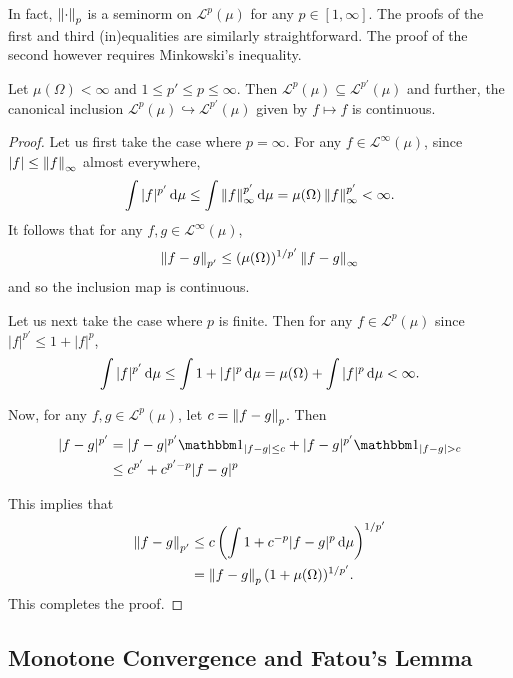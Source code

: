 In fact, $\left\lVert\cdot\right\rVert_p$ is a seminorm on $\mathcal{L}^p(\mu)$ for any $p\in[1,\infty]$. The proofs of the first and third (in)equalities are similarly straightforward. The proof of the second however requires Minkowski's inequality. %

\begin{theorem}
    Let $\mu(\Omega)<\infty$ and $1\leq p'\leq p\leq \infty$. Then $\mathcal{L}^{p}(\mu)\subseteq\mathcal{L}^{p'}(\mu)$ and further, the canonical inclusion $\mathcal{L}^{p}(\mu)\hookrightarrow\mathcal{L}^{p'}(\mu)$ given by $f\mapsto f$ is continuous.
\end{theorem}
\begin{proof}
    Let us first take the case where $p=\infty$. For any $f\in\mathcal{L}^\infty(\mu)$, since $|f|\leq \left\lVert f\right\rVert_\infty$ almost everywhere,
    $$\int |f|^{p'}\operatorname{d}\!{\mu} \leq \int \left\lVert f\right\rVert_\infty^{p'} \operatorname{d}\!{\mu} = \mu(\Omega)\left\lVert f\right\rVert_\infty^{p'} < \infty.$$
    It follows that for any $f,g\in\mathcal{L}^\infty(\mu)$,
    $$\left\lVert f-g\right\rVert_{p'} \leq (\mu(\Omega))^{1/p'}\left\lVert f-g\right\rVert_\infty$$
    and so the inclusion map is continuous.
    
    Let us next take the case where $p$ is finite. Then for any $f\in\mathcal{L}^{p}(\mu)$ since $|f|^{p'}\leq 1+|f|^p$,
    $$\int |f|^{p'}\operatorname{d}\!{\mu} \leq \int 1+|f|^p \operatorname{d}\!{\mu} = \mu(\Omega) + \int |f|^p \operatorname{d}\!{\mu} < \infty.$$
    
    Now, for any $f,g\in\mathcal{L}^{p}(\mu)$, let $c=\left\lVert f-g\right\rVert_{p}$. Then
    \begin{align*}
        |f-g|^{p'} &= |f-g|^{p'}\indic_{|f-g|\leq c} + |f-g|^{p'}\indic_{|f-g|> c} \\
        &\leq c^{p'} + c^{p'-p}|f-g|^p
    \end{align*}
    
    This implies that
    \begin{align*}
        \left\lVert f-g\right\rVert_{p'} &\leq c\left(\int 1+c^{-p}|f-g|^p\operatorname{d}\!{\mu}\right)^{1/p'} \\
        &= \left\lVert f-g\right\rVert_{p}(1+\mu(\Omega))^{1/p'}.
    \end{align*}
    This completes the proof.
\end{proof}

\subsection{Monotone Convergence and Fatou's Lemma}

